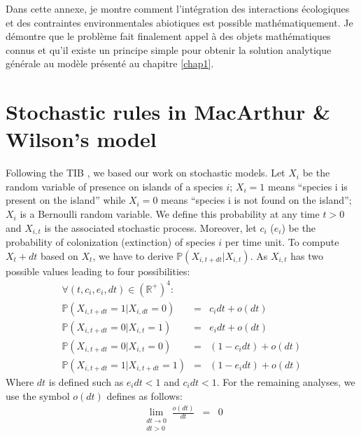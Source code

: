\label{annII}
\addtocounter{chapter}{1}
\setcounter{equation}{0}

Dans cette annexe, je montre comment l'intégration des interactions écologiques
et des contraintes environmentales abiotiques est possible mathématiquement.
Je démontre que le problème fait finalement appel à des objets mathématiques
connus et qu'il existe un principe simple pour obtenir la solution analytique
générale au modèle présenté au chapitre \ref{chap1}.

\section{Stochastic rules in MacArthur \& Wilson's model}

Following the TIB \cite{MacArthur1967}, we based our work on stochastic models. Let $X_{i}$ be the random variable of presence on islands of a species $i$; $X_i=1$ means ``species i is present on the island'' while $X_i=0$ means ``species i is not found on the island''; $X_i$ is a Bernoulli random variable. We define this probability at any time $t>0$ and $X_{i,t}$ is the associated stochastic process. Moreover, let $c_i$ ($e_i$) be the probability of colonization (extinction) of species $i$ per time unit. To compute $X_t+dt$ based on $X_t$, we have to derive $ \mathbb{P}(X_{i,t+dt}|X_{i,t})$. As $X_{i,t}$ has two possible values leading to four possibilities:
\begin{eqnarray}
\nonumber \forall (t,c_i, e_i,dt)\in (\mathbb{R}^{+})^{4}: & &  \\
\label{eqAnn2_1} \mathbb{P}(X_{i,t+dt}=1|X_{i,dt}=0)&=&c_idt+o(dt)\\
\label{eqAnn2_2} \mathbb{P}(X_{i,t+dt}=0|X_{i,t}=1)&=&e_idt+o(dt) \\
\label{eqAnn2_3} \mathbb{P}(X_{i,t+dt}=0|X_{i,t}=0)&=&(1-c_idt)+o(dt) \\
\label{eqAnn2_4} \mathbb{P}(X_{i,t+dt}=1|X_{i,t+dt}=1)&=&(1-e_idt)+o(dt)
\end{eqnarray}
Where $dt$ is defined such as $e_idt<1$ and $c_idt<1$. For the remaining analyses, we use the symbol $o(dt)$ defines as follows:
\begin{eqnarray}
\nonumber \lim\limits_{\substack{dt \to 0 \\ dt>0}}\frac{o(dt)}{dt}&=&0
\end{eqnarray}

